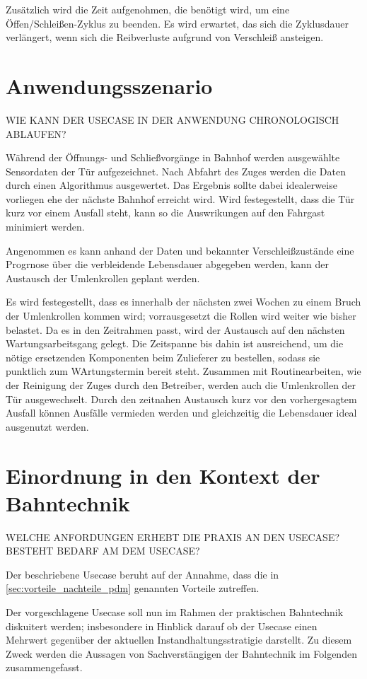 Zusätzlich wird die Zeit aufgenohmen, die benötigt wird, um eine Öffen/Schleißen-Zyklus zu beenden. Es wird erwartet, das sich die Zyklusdauer verlängert, wenn sich die Reibverluste aufgrund von Verschleiß ansteigen.

\section{Anwendungsszenario}
\label{sec:anwendungsszenario_usecase}
WIE KANN DER USECASE IN DER ANWENDUNG CHRONOLOGISCH ABLAUFEN?

Während der Öffnungs- und Schließvorgänge in Bahnhof werden ausgewählte Sensordaten der Tür aufgezeichnet. Nach Abfahrt des Zuges werden die Daten durch einen Algorithmus ausgewertet. Das Ergebnis sollte dabei idealerweise vorliegen ehe der nächste Bahnhof erreicht wird. Wird festegestellt, dass die Tür kurz vor einem Ausfall steht, kann so die Auswrikungen auf den Fahrgast minimiert werden. 

Angenommen es kann anhand der Daten und bekannter Verschleißzustände eine Progrnose über die verbleidende Lebensdauer abgegeben werden, kann der Austausch der Umlenkrollen geplant werden.

Es wird festegestellt, dass es innerhalb der nächsten zwei Wochen zu einem Bruch der Umlenkrollen kommen wird; vorrausgesetzt die Rollen wird weiter wie bisher belastet. Da es in den Zeitrahmen passt, wird der Austausch auf den nächsten Wartungsarbeitsgang gelegt. Die Zeitspanne bis dahin ist ausreichend, um die nötige ersetzenden Komponenten beim Zulieferer zu bestellen, sodass sie punktlich zum WArtungstermin bereit steht. Zusammen mit Routinearbeiten, wie der Reinigung der Zuges durch den Betreiber, werden auch die Umlenkrollen der Tür ausgewechselt. Durch den zeitnahen Austausch kurz vor den vorhergesagtem Ausfall können Ausfälle vermieden werden und gleichzeitig die Lebensdauer ideal ausgenutzt werden. 

\section{Einordnung in den Kontext der Bahntechnik}
\label{sec:kontext_bahntechnik_von_usecase}
WELCHE ANFORDUNGEN ERHEBT DIE PRAXIS AN DEN USECASE? BESTEHT BEDARF AM DEM USECASE?

Der beschriebene Usecase beruht auf der Annahme, dass die in \cref{sec:vorteile_nachteile_pdm} genannten Vorteile zutreffen. 

Der vorgeschlagene Usecase soll nun im Rahmen der praktischen Bahntechnik diskuitert werden; insbesondere in Hinblick darauf ob der Usecase einen Mehrwert gegenüber der aktuellen Instandhaltungsstratigie darstellt. Zu diesem Zweck werden die Aussagen von Sachverstängigen der Bahntechnik im Folgenden zusammengefasst.

